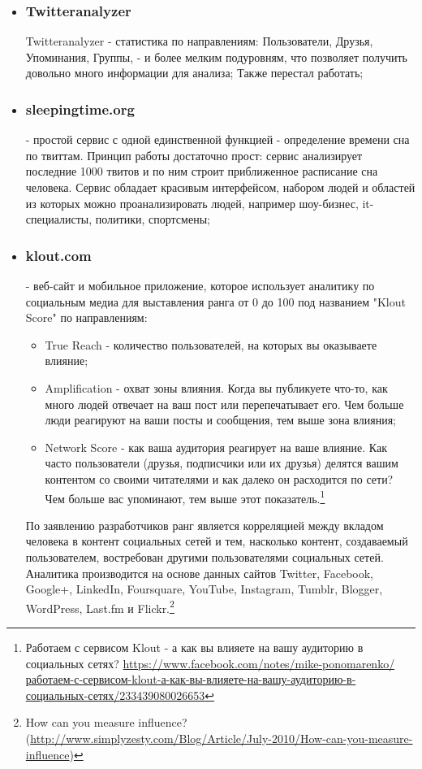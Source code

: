 \begin{itemize}
\begin{itemize}
\item \subsubsection{Twitteranalyzer}
Twitteranalyzer - статистика по  направлениям: Пользователи, Друзья, Упоминания, Группы, - и более мелким подуровням, что позволяет получить довольно много информации для анализа; Также перестал работать; %
\item \subsubsection{sleepingtime.org} - простой сервис с одной единственной функцией - определение времени сна по твиттам. Принцип работы достаточно прост: сервис анализирует последние 1000 твитов и по ним строит приближенное расписание сна человека. Сервис обладает красивым интерфейсом, набором людей и областей из которых можно проанализировать людей, например шоу-бизнес, it-специалисты, политики, спортсмены;
\item \subsubsection{klout.com} - веб-сайт и мобильное приложение, которое использует аналитику по социальным медиа для выставления ранга от 0 до 100 под названием "Klout Score" по направлениям:
	\begin{itemize}
	\item True Reach - количество пользователей, на которых вы оказываете влияние;
	\item Amplification - охват зоны влияния. Когда вы публикуете что-то, как много людей отвечает на ваш пост или перепечатывает его. Чем больше люди реагируют на ваши посты и сообщения, тем выше зона влияния;
	\item Network Score - как ваша аудитория реагирует на ваше влияние. Как часто пользователи (друзья, подписчики или их друзья) делятся вашим контентом со своими читателями и как далеко он расходится по сети? Чем больше вас упоминают, тем выше этот показатель.\footnote{Работаем с сервисом Klout - а как вы влияете на вашу аудиторию в социальных сетях? \url {https://www.facebook.com/notes/mike-ponomarenko/работаем-с-сервисом-klout-а-как-вы-влияете-на-вашу-аудиторию-в-социальных-сетях/233439080026653}}
	\end{itemize}
По заявлению разработчиков ранг является корреляцией между вкладом человека в контент социальных сетей и тем, насколько контент, создаваемый пользователем, востребован другими пользователями социальных сетей. Аналитика производится на основе данных сайтов Twitter, Facebook, Google+, LinkedIn, Foursquare, YouTube, Instagram, Tumblr, Blogger, WordPress, Last.fm и Flickr.\footnote{How can you measure influence? (\url{http://www.simplyzesty.com/Blog/Article/July-2010/How-can-you-measure-influence})}

\end{itemize}
\end{itemize}
